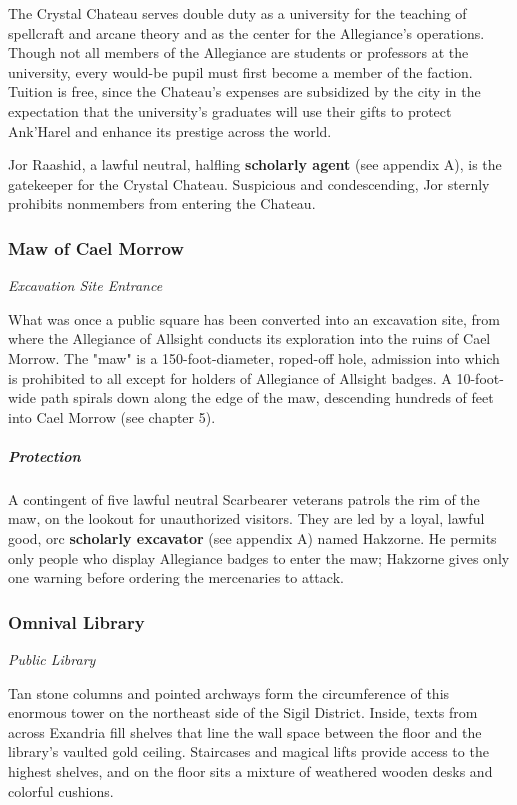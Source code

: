\documentclass[10pt,a4paper,twoside,bg=print,twocolumn,openany,nodeprecatedcode]{dndbook}
\begin{document}
The Crystal Chateau serves double duty as a university for the teaching of spellcraft and arcane theory and as the center for the Allegiance's operations. Though not all members of the Allegiance are students or professors at the university, every would-be pupil must first become a member of the faction. Tuition is free, since the Chateau's expenses are subsidized by the city in the expectation that the university's graduates will use their gifts to protect Ank'Harel and enhance its prestige across the world.

Jor Raashid, a lawful neutral, halfling \textbf{scholarly agent} (see appendix A), is the gatekeeper for the Crystal Chateau. Suspicious and condescending, Jor sternly prohibits nonmembers from entering the Chateau.

\subsubsection{Maw of Cael Morrow}
\textit{Excavation Site Entrance}

What was once a public square has been converted into an excavation site, from where the Allegiance of Allsight conducts its exploration into the ruins of Cael Morrow. The "maw" is a 150-foot-diameter, roped-off hole, admission into which is prohibited to all except for holders of Allegiance of Allsight badges. A 10-foot-wide path spirals down along the edge of the maw, descending hundreds of feet into Cael Morrow (see chapter 5).

\subparagraph{Protection}
A contingent of five lawful neutral Scarbearer veterans patrols the rim of the maw, on the lookout for unauthorized visitors. They are led by a loyal, lawful good, orc \textbf{scholarly excavator} (see appendix A) named Hakzorne. He permits only people who display Allegiance badges to enter the maw; Hakzorne gives only one warning before ordering the mercenaries to attack.

\subsubsection{Omnival Library}
\textit{Public Library}

Tan stone columns and pointed archways form the circumference of this enormous tower on the northeast side of the Sigil District. Inside, texts from across Exandria fill shelves that line the wall space between the floor and the library's vaulted gold ceiling. Staircases and magical lifts provide access to the highest shelves, and on the floor sits a mixture of weathered wooden desks and colorful cushions.
\end{document}
